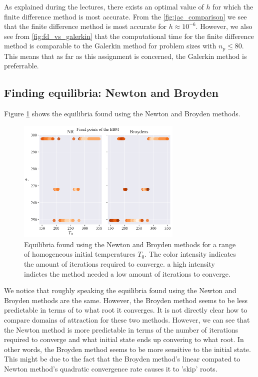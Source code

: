 As explained during the lectures, there exists an optimal value of $h$ for which the finite difference method is most accurate. 
From the \ref{fig:jac_comparison} we see that the finite difference method is most accurate for $h \approx 10^{-6}$. However, we also 
see from \ref{fig:fd_vs_galerkin} that the computational time for the finite difference method is comparable to the Galerkin method for problem
sizes with $n_p \leq 80$. This means that as far as this assignment is concerned, the Galerkin method is preferrable.

\subsection{Finding equilibria: Newton and Broyden}
Figure \ref{fig:equilibria} shows the equilibria found using the Newton and Broyden methods. 
\begin{figure}[H]
    \centering
    \includegraphics[width=0.7\textwidth]{figures/fixed_points.png}
    \caption{Equilibria found using the Newton and Broyden methods for a range of homogeneous initial temperatures $T_0$. 
    The color intensity indicates the amount of iterations required to converge.
    a high intensity indictes the method needed a low amount of iterations to converge.}
    \label{fig:equilibria}
\end{figure}
We notice that roughly speaking the equilibria found using the Newton and Broyden methods are the same. However, the Broyden method
seems to be less predictable in terms of to what root it converges. It is not directly clear how to compare domains of attraction 
for these two methods. However, we can see that the Newton method is more predictable in terms of the number of iterations required to converge and
what initial state ends up convering to what root. In other words, the Broyden method seems to be more sensitive to the initial state.
This might be due to the fact that the Broyden method's linear compated to Newton method's quadratic convergence rate causes it to 'skip' roots.

